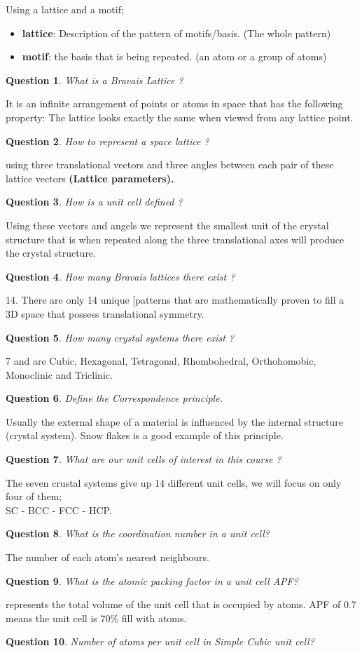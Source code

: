 \documentclass[13]{article}
\newtheorem{exer}{Question}
\begin{document}
Using a lattice and a motif;
\begin{itemize}

	\item \textbf{lattice}: Description of the pattern of motifs/basis. (The whole pattern)
	\item \textbf{motif}: the basis that is being repeated. (an atom or a group of atoms)

\end{itemize}
\begin{exer}
What is a Bravais Lattice ?
\end{exer}
It is an infinite arrangement of points or atoms in space that has the following property: The lattice looks exactly the same when viewed from any lattice point.
\begin{exer}
How to represent a space lattice ?
\end{exer}
using three translational vectors and three angles between each pair of these lattice vectors \textbf{(Lattice parameters).
} \begin{exer}
How is a unit cell defined ?
\end{exer}
Using these vectors and angels we represent the smallest unit of the crystal structure that is when repeated along the three translational axes will produce the crystal structure.
\begin{exer}
How many Bravais lattices there exist ?
\end{exer}
14. There are only 14 unique [patterns that are mathematically proven to fill a 3D space that possess translational symmetry.
\begin{exer}
How many crystal systems there exist ?
\end{exer}
7 and are Cubic, Hexagonal, Tetragonal, Rhombohedral, Orthohomobic, Monoclinic and Triclinic.
\begin{exer}
Define the Correspondence principle.
\end{exer}
Usually the external shape of a material is influenced by the internal structure (crystal system). Snow flakes is a good example of this principle.
\begin{exer}
What are our unit cells of interest in this course ?
\end{exer}
The seven crustal systems give up 14 different unit cells, we will focus on only four of them; \\
SC - BCC - FCC - HCP.
\begin{exer}
What is the coordination number in a unit cell?
\end{exer}
The number of each atom's nearest neighbours.
\begin{exer}
What is the atomic packing factor in a unit cell APF?
\end{exer}
represents the total volume of the unit cell that is occupied by atoms. APF of 0.7 means the unit cell is 70\% fill with atoms.
\begin{exer}
Number of atoms per unit cell in Simple Cubic unit cell?
\end{exer}
\end{document}
